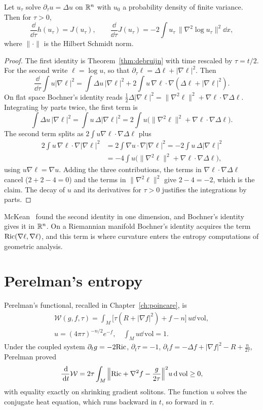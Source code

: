 \begin{lemma}[McKean]
\label{lem:mckean}
Let $u_\tau$ solve $\partial_\tau u = \Delta u$ on $\mathbb{R}^n$ with $u_0$ a probability density of finite variance. Then for $\tau>0$,
\[
\frac{\dd}{\dd\tau}h(u_\tau) = J(u_\tau),\qquad\frac{\dd}{\dd\tau}J(u_\tau) = -2\int u_\tau\,\big\|\nabla^2\log u_\tau\big\|^2\dd x,
\]
where $\|\cdot\|$ is the Hilbert Schmidt norm.
\end{lemma}

\begin{proof}
The first identity is Theorem~\ref{thm:debruijn} with time rescaled by $\tau = t/2$. For the second write $\ell = \log u$, so that $\partial_\tau\ell = \Delta\ell+|\nabla\ell|^2$. Then
\[
\frac{\dd}{\dd\tau}\int u|\nabla\ell|^2 = \int\Delta u\,|\nabla\ell|^2 + 2\int u\,\nabla\ell\cdot\nabla(\Delta\ell+|\nabla\ell|^2).
\]
On flat space Bochner's identity reads $\frac12\Delta|\nabla\ell|^2 = \|\nabla^2\ell\|^2+\nabla\ell\cdot\nabla\Delta\ell$. Integrating by parts twice, the first term is
\[
\int\Delta u\,|\nabla\ell|^2 = \int u\,\Delta|\nabla\ell|^2 = 2\int u\big(\|\nabla^2\ell\|^2+\nabla\ell\cdot\nabla\Delta\ell\big).
\]
The second term splits as $2\int u\nabla\ell\cdot\nabla\Delta\ell$ plus
\[
\begin{aligned}2\int u\,\nabla\ell\cdot\nabla|\nabla\ell|^2 &= 2\int\nabla u\cdot\nabla|\nabla\ell|^2 = -2\int u\,\Delta|\nabla\ell|^2\\ &= -4\int u\big(\|\nabla^2\ell\|^2+\nabla\ell\cdot\nabla\Delta\ell\big),\end{aligned}
\]
using $u\nabla\ell = \nabla u$. Adding the three contributions, the terms in $\nabla\ell\cdot\nabla\Delta\ell$ cancel ($2+2-4 = 0$) and the terms in $\|\nabla^2\ell\|^2$ give $2-4 = -2$, which is the claim. The decay of $u$ and its derivatives for $\tau>0$ justifies the integrations by parts.
\end{proof}

McKean~\cite{mckean1966} found the second identity in one dimension, and Bochner's identity gives it in $\mathbb{R}^n$. On a Riemannian manifold Bochner's identity acquires the term $\mathrm{Ric}(\nabla\ell,\nabla\ell)$, and this term is where curvature enters the entropy computations of geometric analysis.

\section{Perelman's entropy}

Perelman's functional, recalled in Chapter~\ref{ch:poincare}, is
\begin{gather*}
\mathcal{W}(g,f,\tau) = \int_M\big[\tau(R+|\nabla f|^2)+f-n\big]\,u\dd\,\mathrm{vol}, \\
u = (4\pi\tau)^{-n/2}e^{-f},\quad\int_Mu\dd\,\mathrm{vol} = 1.
\end{gather*}
Under the coupled system $\partial_tg = -2\mathrm{Ric}$, $\partial_t\tau = -1$, $\partial_tf = -\Delta f+|\nabla f|^2-R+\frac{n}{2\tau}$, Perelman proved~\cite{perelman2002}
\[
\frac{\,\mathrm{d}}{\,\mathrm{d} t}\mathcal{W} = 2\tau\int_M\Big\|\mathrm{Ric}+\nabla^2f-\frac{g}{2\tau}\Big\|^2u\,\mathrm{d}\,\mathrm{vol}\geq0,
\]
with equality exactly on shrinking gradient solitons. The function $u$ solves the conjugate heat equation, which runs backward in $t$, so forward in $\tau$.

